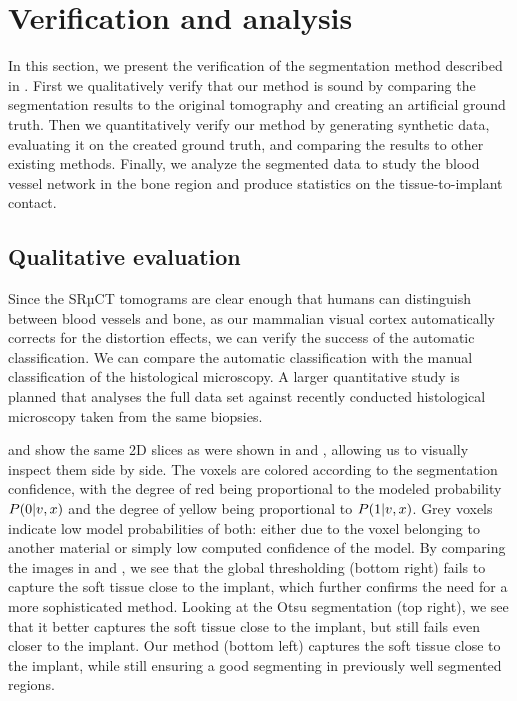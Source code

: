 \section{Verification and analysis}
\label{sec:verification}

In this section, we present the verification of the segmentation method
described in . First we qualitatively verify that our method
is sound by comparing the segmentation results to the original tomography and
creating an artificial ground truth. Then we quantitatively verify our method
by generating synthetic data, evaluating it on the created ground truth, and
comparing the results to other existing methods. Finally, we analyze the
segmented data to study the blood vessel network in the bone region and produce
statistics on the tissue-to-implant contact.

\subsection{Qualitative evaluation}

Since the SRµCT tomograms are clear enough that humans can distinguish between
blood vessels and bone, as our mammalian visual cortex automatically corrects
for the distortion effects, we can verify the success of the automatic
classification. We can compare the automatic classification with the manual
classification of the histological microscopy. A larger quantitative study is
planned that analyses the full data set against recently conducted histological
microscopy taken from the same biopsies.

 and  show the
same 2D slices as were shown in  and ,
allowing us to visually inspect them side by side. The voxels are colored
according to the segmentation confidence, with the degree of red being
proportional to the modeled probability $P\!\left(0\middle\vert v,x\right)$ and the degree of
yellow being proportional to $P\!\left(1\middle\vert v,x\right)$. Grey voxels indicate low model
probabilities of both: either due to the voxel belonging to another material or
simply low computed confidence of the model.  By comparing the images in
 and , we see
that the global thresholding (bottom right) fails to capture the soft tissue
close to the implant, which further confirms the need for a more sophisticated
method. Looking at the Otsu segmentation (top right), we see that it better
captures the soft tissue close to the implant, but still fails even closer to
the implant. Our method (bottom left) captures the soft tissue close to the
implant, while still ensuring a good segmenting in previously well segmented
regions.

